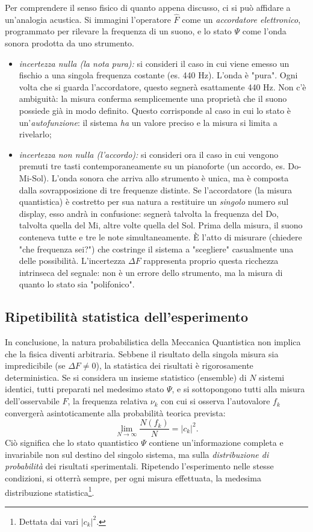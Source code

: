 \documentclass[a4paper,11pt]{report}
\begin{document}
Per comprendere il senso fisico di quanto appena discusso, ci si può affidare a un'analogia acustica. Si immagini l'operatore $\hat{F}$ come un \textit{accordatore elettronico}, programmato per rilevare la frequenza di un suono, e lo stato $\Psi$ come l'onda sonora prodotta da uno strumento.
\begin{itemize}
    \item \textit{incertezza nulla (la nota pura):}
    si consideri il caso in cui viene emesso un fischio a una singola frequenza costante (es. 440 Hz). L'onda è "pura".
    Ogni volta che si guarda l'accordatore, questo segnerà esattamente 440 Hz. Non c'è ambiguità: la misura conferma semplicemente una proprietà che il suono possiede già in modo definito.
    Questo corrisponde al caso in cui lo stato è un'\textit{autofunzione}: il sistema \textit{ha} un valore preciso e la misura si limita a rivelarlo;

    \item \textit{incertezza non nulla (l'accordo):}
    si consideri ora il caso in cui vengono premuti tre tasti contemporaneamente su un pianoforte (un accordo, es. Do-Mi-Sol). L'onda sonora che arriva allo strumento è unica, ma è composta dalla sovrapposizione di tre frequenze distinte.
    Se l'accordatore (la misura quantistica) è costretto per sua natura a restituire un \textit{singolo} numero sul display, esso andrà in confusione: segnerà talvolta la frequenza del Do, talvolta quella del Mi, altre volte quella del Sol.
    Prima della misura, il suono conteneva tutte e tre le note simultaneamente. È l'atto di misurare (chiedere "che frequenza sei?") che costringe il sistema a "scegliere" casualmente una delle possibilità.
    L'incertezza $\Delta F$ rappresenta proprio questa ricchezza intrinseca del segnale: non è un errore dello strumento, ma la misura di quanto lo stato sia "polifonico".
\end{itemize}

\subsection{Ripetibilità statistica dell'esperimento}
In conclusione, la natura probabilistica della Meccanica Quantistica non implica che la fisica diventi arbitraria. Sebbene il risultato della singola misura sia impredicibile (se $\Delta F \neq 0$), la statistica dei risultati è rigorosamente deterministica.
Se si considera un insieme statistico (ensemble) di $N$ sistemi identici, tutti preparati nel medesimo stato $\Psi$, e si sottopongono tutti alla misura dell'osservabile $F$, la frequenza relativa $\nu_k$ con cui si osserva l'autovalore $f_k$ convergerà asintoticamente alla probabilità teorica prevista:
\begin{equation}
    \lim_{N \to \infty} \frac{N(f_k)}{N} = |c_k|^2 .
\end{equation}
Ciò significa che lo stato quantistico $\Psi$ contiene un'informazione completa e invariabile non sul destino del singolo sistema, ma sulla \textit{distribuzione di probabilità} dei risultati sperimentali. Ripetendo l'esperimento nelle stesse condizioni, si otterrà sempre, per ogni misura effettuata, la medesima distribuzione statistica\footnote{Dettata dai vari $|c_k|^2$.}.
\end{document}
